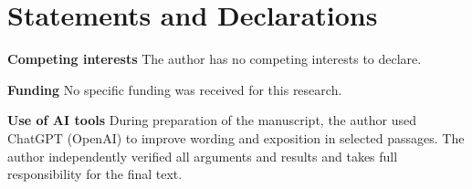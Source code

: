 \documentclass[12pt]{article}
\theoremstyle{plain}
\theoremstyle{remark}
\begin{document}
\section*{Statements and Declarations}
\noindent\textbf{Competing interests} The author has no competing interests to declare.

\vspace{0.35em}
\noindent\textbf{Funding} No specific funding was received for this research.

\vspace{0.35em}
\noindent\textbf{Use of AI tools} During preparation of the manuscript, the author used ChatGPT (OpenAI) to improve wording and exposition in selected passages. The author independently verified all arguments and results and takes full responsibility for the final text.



\appendix




\end{document}
